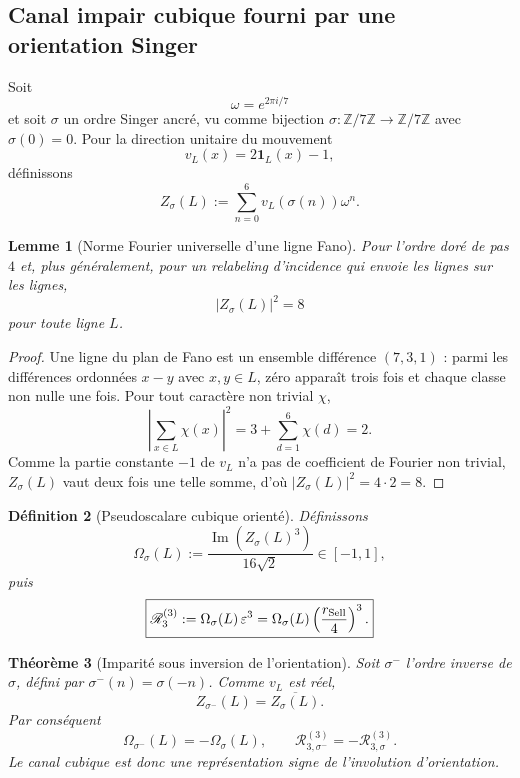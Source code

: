 \documentclass[11pt,a4paper]{article}
\newtheorem{theorem}{Théorème}[section]
\newtheorem{lemma}[theorem]{Lemme}
\newtheorem{definition}[theorem]{Définition}
\begin{document}
\subsection{Canal impair cubique fourni par une orientation Singer}

Soit
\[
 \omega=e^{2\pi i/7}
\]
et soit $\sigma$ un ordre Singer ancré, vu comme bijection
$\sigma:\mathbb Z/7\mathbb Z\to\mathbb Z/7\mathbb Z$ avec $\sigma(0)=0$. Pour la direction unitaire du mouvement
\[
 v_L(x)=2\mathbf1_L(x)-1,
\]
définissons
\begin{equation}\label{eq:v12-Fourier-line}
 Z_\sigma(L)
 :=
 \sum_{n=0}^6v_L(\sigma(n))\omega^n.
\end{equation}

\begin{lemma}[Norme Fourier universelle d'une ligne Fano]\label{lem:v12-fourier-norm}
Pour l'ordre doré de pas $4$ et, plus généralement, pour un relabeling d'incidence qui envoie les lignes sur les lignes,
\begin{equation}\label{eq:v12-fourier-norm}
 \boxed{|Z_\sigma(L)|^2=8}
\end{equation}
pour toute ligne $L$.
\end{lemma}

\begin{proof}
Une ligne du plan de Fano est un ensemble différence $(7,3,1)$ : parmi les différences ordonnées $x-y$ avec $x,y\in L$, zéro apparaît trois fois et chaque classe non nulle une fois. Pour tout caractère non trivial $\chi$,
\[
 \left|\sum_{x\in L}\chi(x)\right|^2
 =3+\sum_{d=1}^6\chi(d)=2.
\]
Comme la partie constante $-1$ de $v_L$ n'a pas de coefficient de Fourier non trivial,
$Z_\sigma(L)$ vaut deux fois une telle somme, d'où $|Z_\sigma(L)|^2=4\cdot2=8$.
\end{proof}

\begin{definition}[Pseudoscalare cubique orienté]\label{def:v12-odd-cubic}
Définissons
\begin{equation}\label{eq:v12-omega-cubic}
 \Omega_\sigma(L)
 :=
 \frac{\operatorname{Im}(Z_\sigma(L)^3)}
 {16\sqrt2}
 \in[-1,1],
\end{equation}
puis
\begin{equation}\label{eq:v12-R3}
 \boxed{
 \mathscr R_3^{(3)}
 :=
 \Omega_\sigma(L)\,\varepsilon^3
 =
 \Omega_\sigma(L)
 \left(\frac{r_{\rm Sell}}4\right)^3.}
\end{equation}
\end{definition}

\begin{theorem}[Imparité sous inversion de l'orientation]\label{thm:v12-orientation-odd}
Soit $\sigma^{-}$ l'ordre inverse de $\sigma$, défini par
$\sigma^{-}(n)=\sigma(-n)$. Comme $v_L$ est réel,
\[
 Z_{\sigma^-}(L)=\overline{Z_\sigma(L)}.
\]
Par conséquent
\begin{equation}\label{eq:v12-odd-flip}
 \boxed{
 \Omega_{\sigma^-}(L)=-\Omega_\sigma(L),\qquad
 \mathscr R_{3,\sigma^-}^{(3)}
 =-\mathscr R_{3,\sigma}^{(3)}.}
\end{equation}
Le canal cubique est donc une représentation signe de l'involution d'orientation.
\end{theorem}
\end{document}
